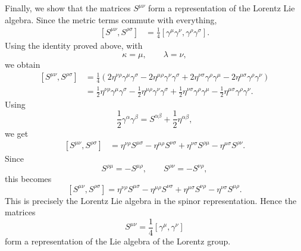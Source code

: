 \documentclass{article}
\begin{document}
Finally, we show that the matrices \(S^{\mu\nu}\) form a representation of the Lorentz Lie algebra. Since the metric terms commute with everything,
\begin{equation}
\begin{split}
    [S^{\mu\nu},S^{\rho\sigma}]
    &=
    \frac14
    [\gamma^\mu\gamma^\nu,\gamma^\rho\gamma^\sigma].
\end{split}
\end{equation}
Using the identity proved above, with
\begin{equation}
    \kappa=\mu,
    \qquad
    \lambda=\nu,
\end{equation}
we obtain
\begin{equation}
\begin{split}
    [S^{\mu\nu},S^{\rho\sigma}]
    &=
    \frac14
    \left(
        2\eta^{\nu\rho}\gamma^\mu\gamma^\sigma
        -
        2\eta^{\mu\rho}\gamma^\nu\gamma^\sigma
        +
        2\eta^{\nu\sigma}\gamma^\rho\gamma^\mu
        -
        2\eta^{\mu\sigma}\gamma^\rho\gamma^\nu
    \right)
    \\
    &=
    \frac12\eta^{\nu\rho}\gamma^\mu\gamma^\sigma
    -
    \frac12\eta^{\mu\rho}\gamma^\nu\gamma^\sigma
    +
    \frac12\eta^{\nu\sigma}\gamma^\rho\gamma^\mu
    -
    \frac12\eta^{\mu\sigma}\gamma^\rho\gamma^\nu .
\end{split}
\end{equation}
Using
\begin{equation}
    \frac12\gamma^\alpha\gamma^\beta
    =
    S^{\alpha\beta}
    +
    \frac12\eta^{\alpha\beta},
\end{equation}
we get
\begin{equation}
\begin{split}
    [S^{\mu\nu},S^{\rho\sigma}]
    &=
    \eta^{\nu\rho}S^{\mu\sigma}
    -
    \eta^{\mu\rho}S^{\nu\sigma}
    +
    \eta^{\nu\sigma}S^{\rho\mu}
    -
    \eta^{\mu\sigma}S^{\rho\nu}.
\end{split}
\end{equation}
Since
\begin{equation}
    S^{\rho\mu}=-S^{\mu\rho},
    \qquad
    S^{\rho\nu}=-S^{\nu\rho},
\end{equation}
this becomes
\begin{equation}
    \boxed{
    [S^{\mu\nu},S^{\rho\sigma}]
    =
    \eta^{\nu\rho}S^{\mu\sigma}
    -
    \eta^{\mu\rho}S^{\nu\sigma}
    +
    \eta^{\mu\sigma}S^{\nu\rho}
    -
    \eta^{\nu\sigma}S^{\mu\rho}
    }.
\end{equation}
This is precisely the Lorentz Lie algebra in the spinor representation. Hence the matrices
\begin{equation}
    S^{\mu\nu}
    =
    \frac14[\gamma^\mu,\gamma^\nu]
\end{equation}
form a representation of the Lie algebra of the Lorentz group.
\end{document}
